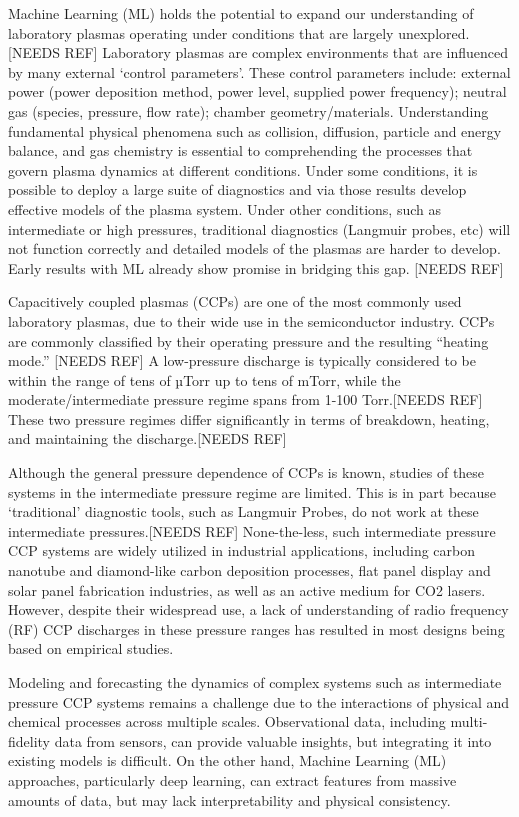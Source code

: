 \documentclass[12pt]{iopart}
\begin{document}
Machine Learning (ML) holds the potential to expand our understanding of laboratory plasmas operating under conditions that are largely unexplored.[NEEDS REF]  Laboratory plasmas are complex environments that are influenced by many external `control parameters'. These control parameters include: external power (power deposition method, power level, supplied power frequency); neutral gas (species, pressure, flow rate); chamber geometry/materials.  Understanding fundamental physical phenomena such as collision, diffusion, particle and energy balance, and gas chemistry is essential to comprehending the processes that govern plasma dynamics at different conditions.  Under some conditions, it is possible to deploy a large suite of diagnostics and via those results develop effective models of the plasma system.  Under other conditions, such as intermediate or high pressures, traditional diagnostics (Langmuir probes, etc) will not function correctly and detailed models of the plasmas are harder to develop.  Early results with ML already show promise in bridging this gap. [NEEDS REF]

Capacitively coupled plasmas (CCPs) are one of the most commonly used laboratory plasmas, due to their wide use in the semiconductor industry.  CCPs are commonly classified by their operating pressure and the resulting ``heating mode.'' [NEEDS REF] A low-pressure discharge is typically considered to be within the range of tens of µTorr up to tens of mTorr, while the moderate/intermediate pressure regime spans from 1-100 Torr.[NEEDS REF] These two pressure regimes differ significantly in terms of breakdown, heating, and maintaining the discharge.[NEEDS REF] 

Although the general pressure dependence of CCPs is known, studies of these systems in the intermediate pressure regime are limited.  This is in part because `traditional' diagnostic tools, such as Langmuir Probes, do not work at these intermediate pressures.[NEEDS REF]  None-the-less, such intermediate pressure CCP systems are widely utilized in industrial applications, including carbon nanotube and diamond-like carbon deposition processes, flat panel display and solar panel fabrication industries, as well as an active medium for CO2 lasers. However, despite their widespread use, a lack of understanding of radio frequency (RF) CCP discharges in these pressure ranges has resulted in most designs being based on empirical studies.

Modeling and forecasting the dynamics of complex systems such as intermediate pressure CCP systems remains a challenge due to the interactions of physical and chemical processes across multiple scales. Observational data, including multi-fidelity data from sensors, can provide valuable insights, but integrating it into existing models is difficult. On the other hand, Machine Learning (ML) approaches, particularly deep learning, can extract features from massive amounts of data, but may lack interpretability and physical consistency.
\end{document}
